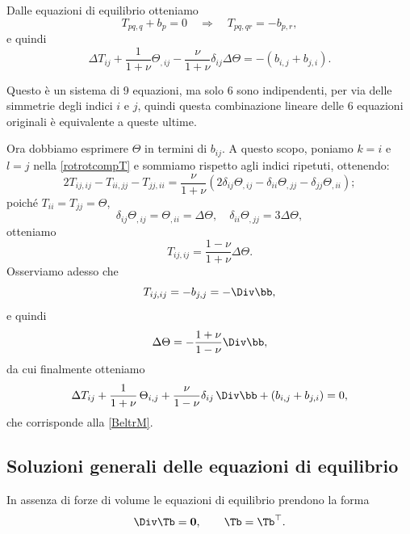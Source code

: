 Dalle equazioni di equilibrio otteniamo
\begin{equation}
	T_{pq,q} + b_p = 0 \quad \Rightarrow \quad T_{pq,qr} = -b_{p,r},
\end{equation}
e quindi
\begin{equation}
	\Delta T_{ij} + \frac{1}{1+\nu} \Theta_{,ij} - \frac{\nu}{1+\nu} \delta_{ij} \Delta \Theta = -(b_{i,j} + b_{j,i}).
\end{equation}

Questo è un sistema di 9 equazioni, ma solo 6 sono indipendenti, per via delle simmetrie degli indici $i$ e $j$, quindi questa combinazione lineare delle 6 equazioni originali è equivalente a queste ultime.

Ora dobbiamo esprimere $\Theta$ in termini di $b_{ij}$. A questo scopo, poniamo $k = i$ e $l = j$ nella \eqref{rotrotcompT} e sommiamo rispetto agli indici ripetuti, ottenendo:
\begin{equation}
	2 T_{ij,ij} - T_{ii,jj} - T_{jj,ii} = \frac{\nu}{1+\nu} \left( 2 \delta_{ij} \Theta_{,ij} - \delta_{ii} \Theta_{,jj} - \delta_{jj} \Theta_{,ii} \right);
\end{equation}
poiché $T_{ii} = T_{jj} = \Theta$,
\begin{equation}
	\delta_{ij} \Theta_{,ij} = \Theta_{,ii} = \Delta \Theta, \quad \delta_{ii} \Theta_{,jj} = 3 \Delta \Theta,
\end{equation}
otteniamo
\begin{equation}
	T_{ij,ij} = \frac{1-\nu}{1+\nu} \Delta \Theta.
\end{equation}
Osserviamo adesso che 
\begin{equation}
	T_{ij,ij} = -b_{j,j} = -\Div \bb,
	\end{equation}
e quindi
\begin{equation}
	\Delta \Theta = -\frac{1+\nu}{1-\nu} \Div \bb,
\end{equation}
da cui finalmente otteniamo
\begin{equation}
\Delta T_{ij}+\frac{1}{1+\nu}\, \Theta_{i,j}+\frac{\nu}{1-\nu}\delta_{ij}\, \Div \bb+(b_{i,j}+b_{j,i})=0,
\end{equation}
che corrisponde alla \eqref{BeltrM}.


\subsection{Soluzioni generali delle equazioni di equilibrio}
In assenza di forze di volume le equazioni di equilibrio prendono la forma
\begin{equation}
\Div \Tb =\mathbf{0}, \qquad \Tb =\Tb^\top.
\end{equation}

